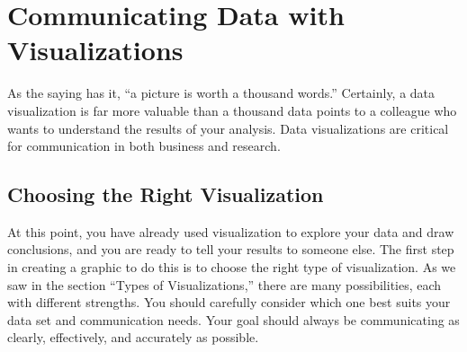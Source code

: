 \section*{Communicating Data with Visualizations}

As the saying has it, ``a picture is worth a thousand words.'' 
Certainly, a data visualization is far more valuable than a thousand data points to a colleague who wants to understand the results of your analysis. 
Data visualizations are critical for communication in both business and research.

\subsection*{Choosing the Right Visualization}
At this point, you have already used visualization to explore your data and draw conclusions, and you are ready to tell your results to someone else. 
The first step in creating a graphic to do this is to choose the right type of visualization. 
As we saw in the section ``Types of Visualizations,'' there are many possibilities, each with different strengths. 
You should carefully consider which one best suits your data set and communication needs.  Your goal should always be communicating as clearly, effectively, and accurately as possible.  

